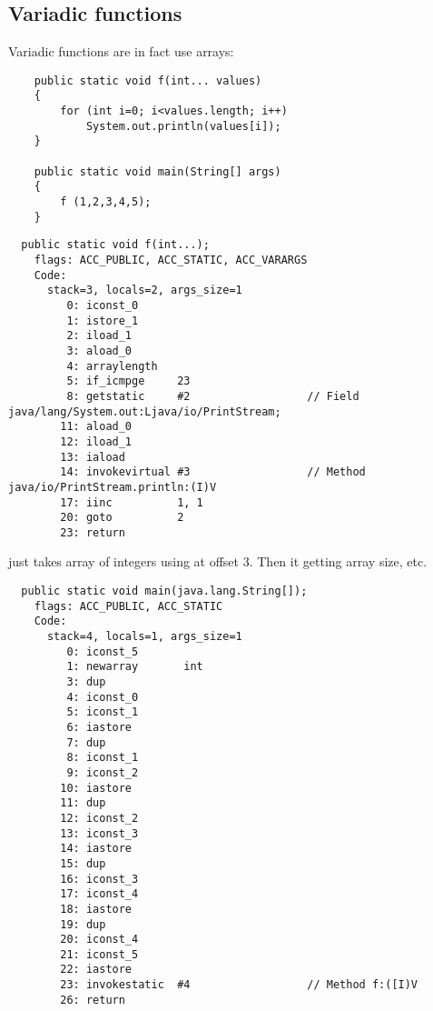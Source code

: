 \subsection{Variadic functions}

Variadic functions are in fact use arrays:

\begin{lstlisting}
	public static void f(int... values)
	{
		for (int i=0; i<values.length; i++)
			System.out.println(values[i]);
	}

	public static void main(String[] args) 
	{
		f (1,2,3,4,5);
	}
\end{lstlisting}

\begin{lstlisting}
  public static void f(int...);
    flags: ACC_PUBLIC, ACC_STATIC, ACC_VARARGS
    Code:
      stack=3, locals=2, args_size=1
         0: iconst_0      
         1: istore_1      
         2: iload_1       
         3: aload_0       
         4: arraylength   
         5: if_icmpge     23
         8: getstatic     #2                  // Field java/lang/System.out:Ljava/io/PrintStream;
        11: aload_0       
        12: iload_1       
        13: iaload        
        14: invokevirtual #3                  // Method java/io/PrintStream.println:(I)V
        17: iinc          1, 1
        20: goto          2
        23: return        
\end{lstlisting}

 just takes array of integers using  at offset 3.
Then it getting array size, etc.

\begin{lstlisting}
  public static void main(java.lang.String[]);
    flags: ACC_PUBLIC, ACC_STATIC
    Code:
      stack=4, locals=1, args_size=1
         0: iconst_5      
         1: newarray       int
         3: dup           
         4: iconst_0      
         5: iconst_1      
         6: iastore       
         7: dup           
         8: iconst_1      
         9: iconst_2      
        10: iastore       
        11: dup           
        12: iconst_2      
        13: iconst_3      
        14: iastore       
        15: dup           
        16: iconst_3      
        17: iconst_4      
        18: iastore       
        19: dup           
        20: iconst_4      
        21: iconst_5      
        22: iastore       
        23: invokestatic  #4                  // Method f:([I)V
        26: return        
\end{lstlisting}

